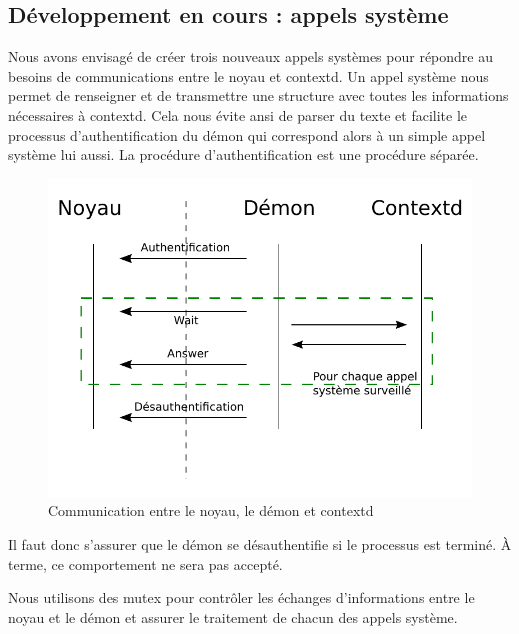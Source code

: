\documentclass[pdftex,a4paper,titlepage,11pt,openright]{article}
\begin{document}
\subsection{Développement en cours : appels système}

Nous avons envisagé de créer trois nouveaux appels systèmes pour répondre au besoins de communications entre le noyau et contextd. Un appel système nous permet de renseigner et de transmettre une structure avec toutes les informations nécessaires à contextd. Cela nous évite ansi de parser du texte et facilite le processus d'authentification du démon qui correspond alors à un simple appel système lui aussi. La procédure d'authentification est une procédure séparée.

\begin{figure}[hb]
	\centering
	\includegraphics{global.pdf}
	\caption{Communication entre le noyau, le démon et contextd}
\end{figure}

Il faut donc s'assurer que le démon se désauthentifie si le processus est terminé. \`A terme, ce comportement ne sera pas accepté.

Nous utilisons des mutex pour contrôler les échanges d'informations entre le noyau et le démon et assurer le traitement de chacun des appels système.
\end{document}
